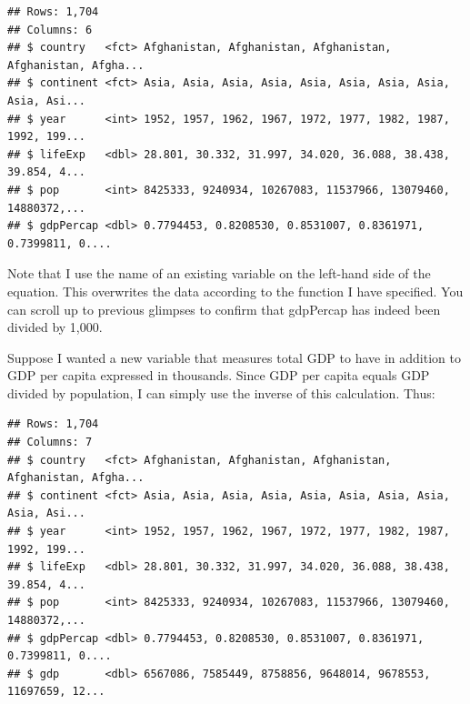 \documentclass[
]{book}
\newenvironment{Shaded}{\begin{snugshade}}{\end{snugshade}}
\newcommand{\DataTypeTok}[1]{\textcolor[rgb]{0.13,0.29,0.53}{#1}}
\newcommand{\DecValTok}[1]{\textcolor[rgb]{0.00,0.00,0.81}{#1}}
\newcommand{\KeywordTok}[1]{\textcolor[rgb]{0.13,0.29,0.53}{\textbf{#1}}}
\newcommand{\NormalTok}[1]{#1}
\newcommand{\OperatorTok}[1]{\textcolor[rgb]{0.81,0.36,0.00}{\textbf{#1}}}
\newcommand{\StringTok}[1]{\textcolor[rgb]{0.31,0.60,0.02}{#1}}
\begin{document}
\begin{verbatim}
## Rows: 1,704
## Columns: 6
## $ country   <fct> Afghanistan, Afghanistan, Afghanistan, Afghanistan, Afgha...
## $ continent <fct> Asia, Asia, Asia, Asia, Asia, Asia, Asia, Asia, Asia, Asi...
## $ year      <int> 1952, 1957, 1962, 1967, 1972, 1977, 1982, 1987, 1992, 199...
## $ lifeExp   <dbl> 28.801, 30.332, 31.997, 34.020, 36.088, 38.438, 39.854, 4...
## $ pop       <int> 8425333, 9240934, 10267083, 11537966, 13079460, 14880372,...
## $ gdpPercap <dbl> 0.7794453, 0.8208530, 0.8531007, 0.8361971, 0.7399811, 0....
\end{verbatim}

Note that I use the name of an existing variable on the left-hand side of the equation. This overwrites the data according to the function I have specified. You can scroll up to previous glimpses to confirm that gdpPercap has indeed been divided by 1,000.

Suppose I wanted a new variable that measures total GDP to have in addition to GDP per capita expressed in thousands. Since GDP per capita equals GDP divided by population, I can simply use the inverse of this calculation. Thus:

\begin{Shaded}
\end{Shaded}

\begin{verbatim}
## Rows: 1,704
## Columns: 7
## $ country   <fct> Afghanistan, Afghanistan, Afghanistan, Afghanistan, Afgha...
## $ continent <fct> Asia, Asia, Asia, Asia, Asia, Asia, Asia, Asia, Asia, Asi...
## $ year      <int> 1952, 1957, 1962, 1967, 1972, 1977, 1982, 1987, 1992, 199...
## $ lifeExp   <dbl> 28.801, 30.332, 31.997, 34.020, 36.088, 38.438, 39.854, 4...
## $ pop       <int> 8425333, 9240934, 10267083, 11537966, 13079460, 14880372,...
## $ gdpPercap <dbl> 0.7794453, 0.8208530, 0.8531007, 0.8361971, 0.7399811, 0....
## $ gdp       <dbl> 6567086, 7585449, 8758856, 9648014, 9678553, 11697659, 12...
\end{verbatim}
\end{document}
